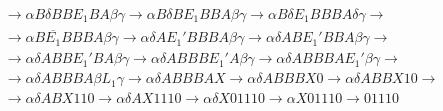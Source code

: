 \begin{ejercicio}
\begin{enumerate}
\begin{description}
\begin{align*}
                      &\rightarrow \alpha B \delta BB E_1 BA \beta \gamma \rightarrow \alpha B \delta B E_1 BBA \beta \gamma \rightarrow \alpha B \delta E_1 BBBA \delta \gamma \rightarrow \\
                      &\rightarrow \alpha B \overline{E_1} BBBA \beta \gamma \rightarrow \alpha \delta A E_1' BBBA \beta \gamma \rightarrow \alpha \delta AB E_1' BBA \beta \gamma \rightarrow \\
                      &\rightarrow \alpha \delta ABB E_1' BA \beta \gamma \rightarrow \alpha \delta ABBB E_1' A \beta \gamma \rightarrow \alpha \delta ABBBA E_1' \beta \gamma \rightarrow \\
                      &\rightarrow \alpha \delta ABBBA \beta L_1 \gamma \rightarrow \alpha \delta ABBBA X \rightarrow \alpha \delta ABBBX0 \rightarrow \alpha \delta ABBX10 \rightarrow \\
                      &\rightarrow \alpha \delta ABX110 \rightarrow \alpha \delta AX1110 \rightarrow \alpha \delta X01110 \rightarrow \alpha X 01110 \rightarrow 01110
                \end{align*}
            \end{description}
    \end{enumerate}
\end{ejercicio}


